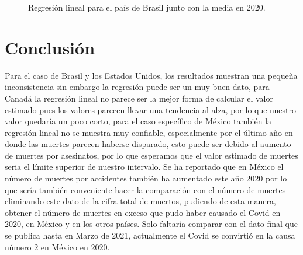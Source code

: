 \documentclass[12pt]{article}
\begin{document}
\begin{figure}[H]
\centering
{}%
\hfill
{}%
\hfill
\caption{Regresión lineal para el país de Brasil junto con la media en 2020.}

\label{fig:RegresionBrasil}
\end{figure}   
\hfill


\section{Conclusión}

Para el caso de Brasil y los Estados Unidos, los resultados muestran una pequeña inconsistencia sin embargo la regresión puede ser un muy buen dato, para Canadá la regresión lineal no parece ser la mejor forma de calcular el valor estimado pues los valores parecen llevar una tendencia al alza, por lo que nuestro valor quedaría un poco corto, para el caso específico de México también la regresión lineal no se muestra muy confiable, especialmente por el último año en donde las muertes parecen haberse disparado, esto puede ser debido al aumento de muertes por asesinatos, por lo que esperamos que el valor estimado de muertes seria el límite superior de nuestro intervalo. Se ha reportado que en México el número de muertes por accidentes también ha aumentado este año 2020 por lo que sería también conveniente hacer la comparación con el número de muertes eliminando este dato de la cifra total de muertos, pudiendo de esta manera, obtener el número de muertes en exceso que pudo haber causado el Covid en 2020, en México y en los otros países.
Solo faltaría comparar con el dato final que se publica hasta en Marzo de 2021, actualmente el Covid se convirtió en la causa número 2 en México en 2020.

\printbibliography[title={Referencias}]
\end{document}
